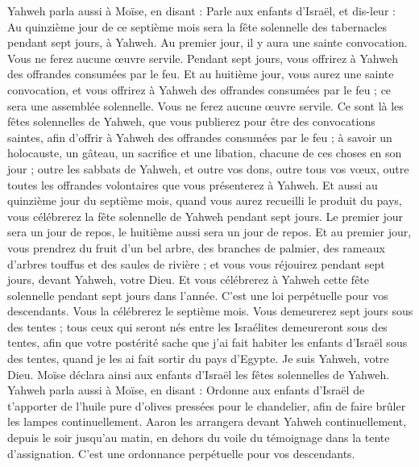 \begin{multicols}{2}
Yahweh parla aussi à Moïse, en disant :
Parle aux enfants d'Israël, et dis-leur : Au quinzième jour de ce septième mois sera la fête solennelle des tabernacles pendant sept jours, à Yahweh.
Au premier jour, il y aura une sainte convocation. Vous ne ferez aucune œuvre servile.
Pendant sept jours, vous offrirez à Yahweh des offrandes consumées par le feu. Et au huitième jour, vous aurez une sainte convocation, et vous offrirez à Yahweh des offrandes consumées par le feu ; ce sera une assemblée solennelle. Vous ne ferez aucune œuvre servile.
Ce sont là les fêtes solennelles de Yahweh, que vous publierez pour être des convocations saintes, afin d'offrir à Yahweh des offrandes consumées par le feu ; à savoir un holocauste, un gâteau, un sacrifice et une libation, chacune de ces choses en son jour ;
outre les sabbats de Yahweh, et outre vos dons, outre tous vos vœux, outre toutes les offrandes volontaires que vous présenterez à Yahweh.
Et aussi au quinzième jour du septième mois, quand vous aurez recueilli le produit du pays, vous célébrerez la fête solennelle de Yahweh pendant sept jours. Le premier jour sera un jour de repos, le huitième aussi sera un jour de repos.
Et au premier jour, vous prendrez du fruit d'un bel arbre, des branches de palmier, des rameaux d'arbres touffus et des saules de rivière ; et vous vous réjouirez pendant sept jours, devant Yahweh, votre Dieu.
Et vous célébrerez à Yahweh cette fête solennelle pendant sept jours dans l'année. C'est une loi perpétuelle pour vos descendants. Vous la célébrerez le septième mois.
Vous demeurerez sept jours sous des tentes ; tous ceux qui seront nés entre les Israélites demeureront sous des tentes,
afin que votre postérité sache que j'ai fait habiter les enfants d'Israël sous des tentes, quand je les ai fait sortir du pays d'Egypte. Je suis Yahweh, votre Dieu.
Moïse déclara ainsi aux enfants d'Israël les fêtes solennelles de Yahweh.
\VerseOne{}Yahweh parla aussi à Moïse, en disant :
Ordonne aux enfants d'Israël de t'apporter de l'huile pure d'olives pressées pour le chandelier, afin de faire brûler les lampes continuellement.
Aaron les arrangera devant Yahweh continuellement, depuis le soir jusqu'au matin, en dehors du voile du témoignage dans la tente d'assignation. C'est une ordonnance perpétuelle pour vos descendants.

\end{multicols}
